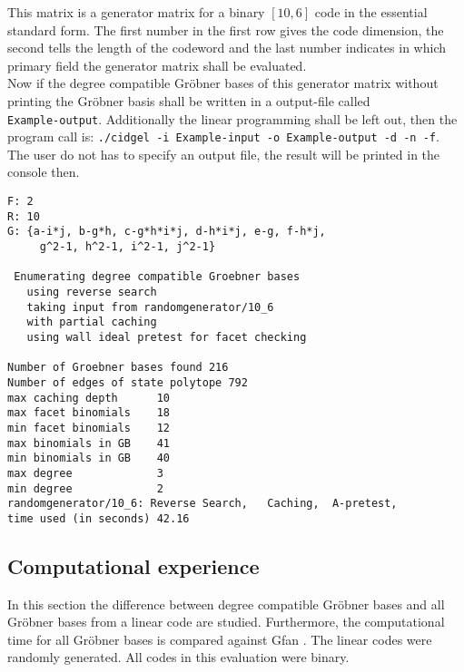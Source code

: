 This matrix is a generator matrix for a binary $[10,6]$ code in the essential standard form. 
The first number in the first row gives the code dimension, the second tells the length of the codeword and the last number indicates in which primary field the generator matrix shall be evaluated.\\

Now if the degree compatible Gröbner bases of this generator  matrix without printing the Gröbner basis shall be written in a output-file called \\ \texttt{Example-output}. Additionally the linear programming shall be left out, then the program call is: \texttt{./cidgel -i Example-input -o Example-output -d -n -f}.
The user do not has to specify an output file, the result will be printed in the console then.

\newpage

 \begin{lstlisting}[basicstyle=\fontfamily{courier}\selectfont,language={}] %
% starting GB:
F: 2
R: 10
G: {a-i*j, b-g*h, c-g*h*i*j, d-h*i*j, e-g, f-h*j,
	 g^2-1, h^2-1, i^2-1, j^2-1}

 Enumerating degree compatible Groebner bases
   using reverse search
   taking input from randomgenerator/10_6
   with partial caching
   using wall ideal pretest for facet checking

Number of Groebner bases found 216
Number of edges of state polytope 792
max caching depth      10
max facet binomials    18
min facet binomials    12
max binomials in GB    41
min binomials in GB    40
max degree             3
min degree             2
randomgenerator/10_6: Reverse Search,   Caching,  A-pretest,
time used (in seconds) 42.16
\end{lstlisting}
  
\newpage


\subsection{Computational experience}
\label{subsec:compexp} 
In this section the difference between degree compatible Gröbner bases and all Gröbner bases from a linear code are studied. Furthermore, the computational time for all Gröbner bases is compared against Gfan \cite{gfan}.
The linear codes were randomly generated. All codes in this evaluation were binary.

